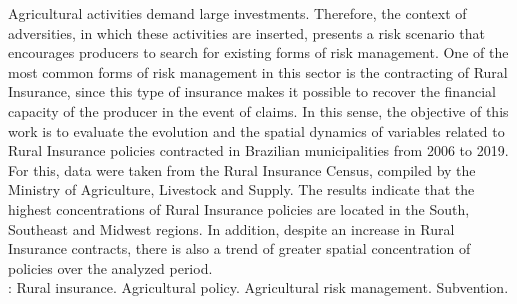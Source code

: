 \noindent Agricultural activities demand large investments. Therefore, the context of adversities, in which these activities are inserted, presents a risk scenario that encourages producers to search for existing forms of risk management. One of the most common forms of risk management in this sector is the contracting of Rural Insurance, since this type of insurance makes it possible to recover the financial capacity of the producer in the event of claims. In this sense, the objective of this work is to evaluate the evolution and the spatial dynamics of variables related to Rural Insurance policies contracted in Brazilian municipalities from 2006 to 2019. For this, data were taken from the Rural Insurance Census, compiled by the Ministry of Agriculture, Livestock and Supply. The results indicate that the highest concentrations of Rural Insurance policies are located in the South, Southeast and Midwest regions. In addition, despite an increase in Rural Insurance contracts, there is also a trend of greater spatial concentration of policies over the analyzed period. \\ 
\newline
{}:  Rural insurance. Agricultural policy. Agricultural risk management. Subvention.
